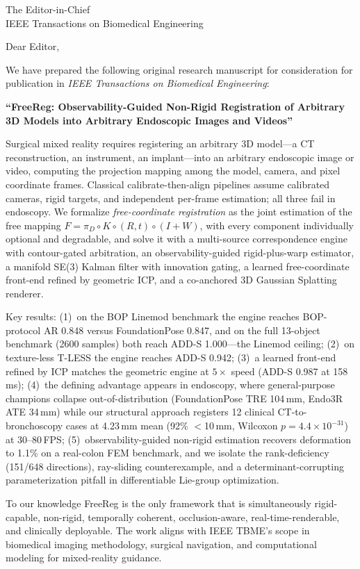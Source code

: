 \documentclass[10pt]{letter}
\begin{document}
\begin{letter}{The Editor-in-Chief\\IEEE Transactions on Biomedical Engineering}
\opening{Dear Editor,}

We have prepared the following original research manuscript for consideration
for publication in \emph{IEEE Transactions on Biomedical Engineering}:

\textbf{``FreeReg: Observability-Guided Non-Rigid Registration of Arbitrary 3D
Models into Arbitrary Endoscopic Images and Videos''}

Surgical mixed reality requires registering an arbitrary 3D model---a CT
reconstruction, an instrument, an implant---into an arbitrary endoscopic image
or video, computing the projection mapping among the model, camera, and pixel
coordinate frames. Classical calibrate-then-align pipelines assume calibrated
cameras, rigid targets, and independent per-frame estimation; all three fail in
endoscopy. We formalize \emph{free-coordinate registration} as the joint
estimation of the free mapping $F=\pi_{D}\circ K\circ(R,t)\circ(I+W)$, with
every component individually optional and degradable, and solve it with a
multi-source correspondence engine with contour-gated arbitration, an
observability-guided rigid-plus-warp estimator, a manifold SE(3) Kalman filter
with innovation gating, a learned free-coordinate front-end refined by
geometric ICP, and a co-anchored 3D Gaussian Splatting renderer.

Key results: (1)~on the BOP Linemod benchmark the engine reaches BOP-protocol
AR 0.848 versus FoundationPose 0.847, and on the full 13-object benchmark (2600
samples) both reach ADD-S 1.000---the Linemod ceiling; (2)~on texture-less
T-LESS the engine reaches ADD-S 0.942; (3)~a learned front-end refined by ICP
matches the geometric engine at $5\times$ speed (ADD-S 0.987 at 158\,ms);
(4)~the defining advantage appears in endoscopy, where general-purpose
champions collapse out-of-distribution (FoundationPose TRE 104\,mm, Endo3R ATE
34\,mm) while our structural approach registers 12 clinical CT-to-bronchoscopy
cases at 4.23\,mm mean (92\% $<$10\,mm, Wilcoxon $p=4.4\times10^{-31}$) at
30--80\,FPS; (5)~observability-guided non-rigid estimation recovers deformation
to 1.1\% on a real-colon FEM benchmark, and we isolate the rank-deficiency
(151/648 directions), ray-sliding counterexample, and a determinant-corrupting
parameterization pitfall in differentiable Lie-group optimization.

To our knowledge FreeReg is the only framework that is simultaneously
rigid-capable, non-rigid, temporally coherent, occlusion-aware,
real-time-renderable, and clinically deployable. The work aligns with IEEE
TBME's scope in biomedical imaging methodology, surgical navigation, and
computational modeling for mixed-reality guidance.


\end{letter}
\end{document}

